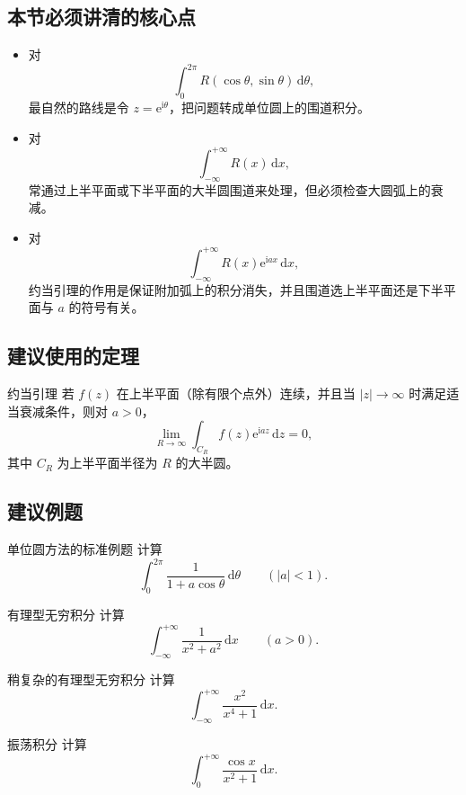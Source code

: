 \subsection*{本节必须讲清的核心点}
\begin{itemize}
    \item 对
    \[
        \int_0^{2\pi} R(\cos\theta,\sin\theta)\,\mathrm{d}\theta,
    \]
    最自然的路线是令 $z=\mathrm{e}^{\mathrm{i}\theta}$，把问题转成单位圆上的围道积分。
    \item 对
    \[
        \int_{-\infty}^{+\infty} R(x)\,\mathrm{d}x,
    \]
    常通过上半平面或下半平面的大半圆围道来处理，但必须检查大圆弧上的衰减。
    \item 对
    \[
        \int_{-\infty}^{+\infty} R(x)\mathrm{e}^{\mathrm{i}ax}\,\mathrm{d}x,
    \]
    约当引理的作用是保证附加弧上的积分消失，并且围道选上半平面还是下半平面与 $a$ 的符号有关。
\end{itemize}

\subsection*{建议使用的定理}
\begin{dingli}{约当引理}{}
若 $f(z)$ 在上半平面（除有限个点外）连续，并且当 $|z|\to \infty$ 时满足适当衰减条件，则对 $a>0$，
\[
    \lim_{R\to\infty}\int_{C_R} f(z)\mathrm{e}^{\mathrm{i}az}\,\mathrm{d}z = 0,
\]
其中 $C_R$ 为上半平面半径为 $R$ 的大半圆。
\end{dingli}

\subsection*{建议例题}
\begin{lizi}{单位圆方法的标准例题}{}
计算
\[
    \int_0^{2\pi}\frac{1}{1+a\cos\theta}\,\mathrm{d}\theta
    \qquad (|a|<1).
\]
\end{lizi}

\begin{lizi}{有理型无穷积分}{}
计算
\[
    \int_{-\infty}^{+\infty}\frac{1}{x^2+a^2}\,\mathrm{d}x
    \qquad (a>0).
\]
\end{lizi}

\begin{lizi}{稍复杂的有理型无穷积分}{}
计算
\[
    \int_{-\infty}^{+\infty}\frac{x^2}{x^4+1}\,\mathrm{d}x.
\]
\end{lizi}

\begin{lizi}{振荡积分}{}
计算
\[
    \int_0^{+\infty}\frac{\cos x}{x^2+1}\,\mathrm{d}x.
\]
\end{lizi}

